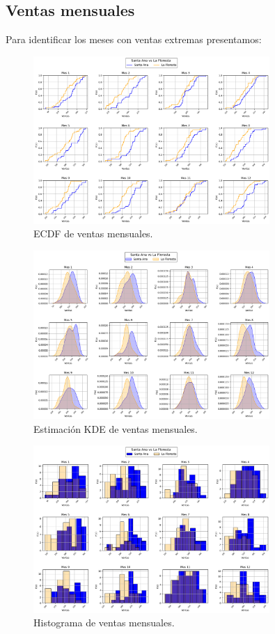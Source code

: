 \documentclass[12pt,a4paper]{article}
\begin{document}
\subsection{Ventas mensuales}
Para identificar los meses con ventas extremas presentamos:
\begin{figure}[H]
  \centering
  \includegraphics[width=0.8\textwidth]{graphs/meses_fde.png}
  \caption{ECDF de ventas mensuales.}
  \label{fig:ecdf_meses}
\end{figure}
\begin{figure}[H]
  \centering
  \includegraphics[width=0.8\textwidth]{graphs/meses_kde.png}
  \caption{Estimación KDE de ventas mensuales.}
  \label{fig:kde_meses}
\end{figure}
\begin{figure}[H]
  \centering
  \includegraphics[width=0.8\textwidth]{graphs/meses_histo.png}
  \caption{Histograma de ventas mensuales.}
  \label{fig:histo_meses}
\end{figure}
\end{document}
